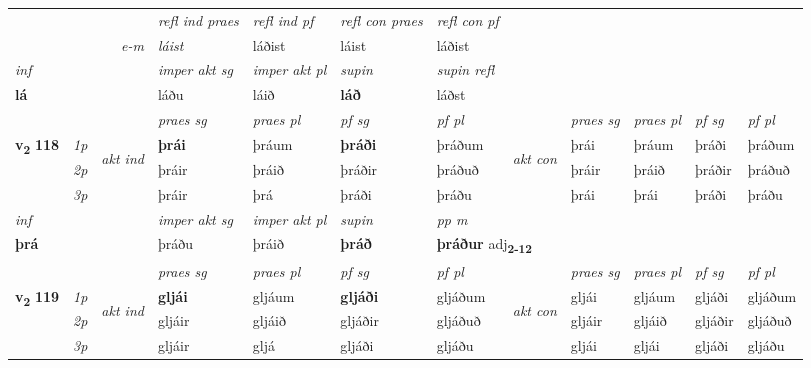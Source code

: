 \begin{longtable}[l]{X>{\footnotesize\itshape}llXXXXlXXXX}
 & && \textit{refl ind praes} & \textit{refl ind pf} & \textit{refl con praes} & \textit{refl con pf} \\*
\multicolumn{3}{r}{\textit{e-m}}& láist & láðist & láist & láðist \\*

\cmidrule{4-7}
   {\textit{inf}} & &  & \textit{imper akt sg} & \textit{imper akt pl}    & \textit{supin} & \textit{supin refl}  \\*
  {\textbf{lá}} & && láðu  & láið    &  \textbf{láð} & láðst  \\*

\midrule

 & &   & \textit{praes sg}  & \textit{praes pl}    & \textit{ pf sg} & \textit{pf pl} & & \textit{praes sg}  & \textit{praes pl}    & \textit{pf sg} & \textit{pf pl }  \\ \cmidrule{4-7} \cmidrule{9-12}
 \multirow{2}{*}{{{\textbf{v{\textsubscript{2}}} \Large{\textbf{118}}}}}  & 1p & \multirow{3}{*}{\begin{turn}{90}\textit{akt ind}\end{turn}} & \textbf{þrái} & þráum & \textbf{þráði} & þráðum & \multirow{3}{*}{\begin{turn}{90}\textit{akt con}\end{turn}} &þrái & þráum & þráði & þráðum\\*
 & 2p &  &  þráir  & þráið & þráðir & þráðuð & & þráir & þráið & þráðir & þráðuð \\*
 & 3p &  & þráir & þrá & þráði & þráðu & & þrái & þrái& þráði & þráðu \\*
\cmidrule{4-7} \cmidrule{9-12}

   {\textit{inf}} & &  & \textit{imper akt sg} & \textit{imper akt pl}    & \textit{supin}  & \textit{pp m} \\*
  {\textbf{þrá}} & && þráðu  & þráið    &  \textbf{þráð}  & \multicolumn{2}{l}{\textbf{þráður} adj\textbf{\textsubscript{2-12}}} \\*

\midrule

 & &   & \textit{praes sg}  & \textit{praes pl}    & \textit{ pf sg} & \textit{pf pl} & & \textit{praes sg}  & \textit{praes pl}    & \textit{pf sg} & \textit{pf pl }  \\ \cmidrule{4-7} \cmidrule{9-12}
 \multirow{2}{*}{{{\textbf{v{\textsubscript{2}}} \Large{\textbf{119}}}}}  & 1p & \multirow{3}{*}{\begin{turn}{90}\textit{akt ind}\end{turn}} & \textbf{gljái} & gljáum & \textbf{gljáði} & gljáðum & \multirow{3}{*}{\begin{turn}{90}\textit{akt con}\end{turn}} &gljái & gljáum & gljáði & gljáðum\\*
 & 2p &  &  gljáir  & gljáið & gljáðir & gljáðuð & & gljáir & gljáið & gljáðir & gljáðuð \\*
 & 3p &  & gljáir & gljá & gljáði & gljáðu & & gljái & gljái& gljáði & gljáðu \\*
\cmidrule{4-7} \cmidrule{9-12}


\end{longtable}
